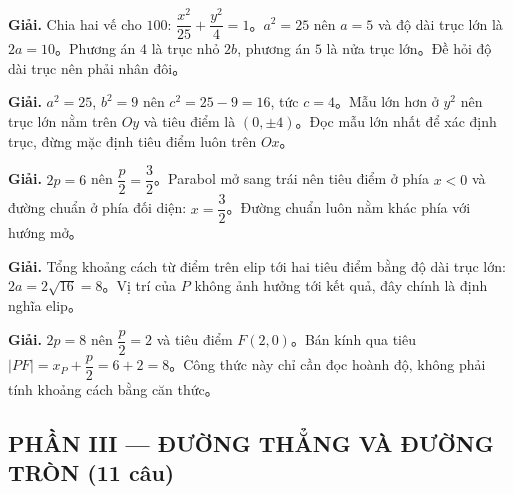 \documentclass[11pt, a4paper]{article}
\begin{document}
\vspace{0.3cm}
\begin{dapan}[21 — Đáp án C]

\textbf{Giải.} Chia hai vế cho $100$: $\dfrac{x^2}{25}+\dfrac{y^2}{4}=1$。$a^2=25$ nên $a=5$ và độ dài trục lớn là $2a=10$。Phương án $4$ là trục nhỏ $2b$, phương án $5$ là nửa trục lớn。Đề hỏi độ dài trục nên phải nhân đôi。


\end{dapan}
\vspace{0.3cm}
\begin{dapan}[22 — Đáp án D]

\textbf{Giải.} $a^2=25$, $b^2=9$ nên $c^2=25-9=16$, tức $c=4$。Mẫu lớn hơn ở $y^2$ nên trục lớn nằm trên $Oy$ và tiêu điểm là $(0,\pm4)$。Đọc mẫu lớn nhất để xác định trục, đừng mặc định tiêu điểm luôn trên $Ox$。


\end{dapan}
\vspace{0.3cm}
\begin{dapan}[23 — Đáp án B]

\textbf{Giải.} $2p=6$ nên $\dfrac{p}{2}=\dfrac{3}{2}$。Parabol mở sang trái nên tiêu điểm ở phía $x<0$ và đường chuẩn ở phía đối diện: $x=\dfrac{3}{2}$。Đường chuẩn luôn nằm khác phía với hướng mở。


\end{dapan}
\vspace{0.3cm}
\begin{dapan}[24 — Đáp án A]

\textbf{Giải.} Tổng khoảng cách từ điểm trên elip tới hai tiêu điểm bằng độ dài trục lớn: $2a=2\sqrt{16}=8$。Vị trí của $P$ không ảnh hưởng tới kết quả, đây chính là định nghĩa elip。


\end{dapan}
\vspace{0.3cm}
\begin{dapan}[25 — Đáp án C]

\textbf{Giải.} $2p=8$ nên $\dfrac{p}{2}=2$ và tiêu điểm $F(2,0)$。Bán kính qua tiêu $\lvert PF\rvert=x_P+\dfrac{p}{2}=6+2=8$。Công thức này chỉ cần đọc hoành độ, không phải tính khoảng cách bằng căn thức。

\subsection{PHẦN III — ĐƯỜNG THẲNG VÀ ĐƯỜNG TRÒN (11 câu)}


\end{dapan}
\vspace{0.3cm}
\end{document}
